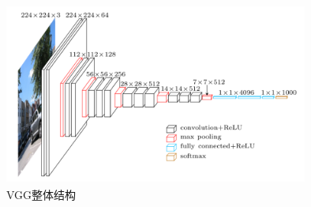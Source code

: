\begin{figure}[h]
  \centering
  \includegraphics[width=10cm, height=6cm]{Img/vgg.png}
  \caption{VGG整体结构}
  \label{fig:vgg}
\end{figure}
